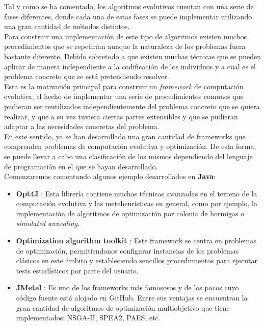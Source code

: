 Tal y como se ha comentado, los algoritmos evolutivos cuentan con una serie de fases diferentes, donde cada una de estas fases se puede implementar utilizando una gran cantidad de métodos distintos.\\

Para construir una implementación de este tipo de algoritmos existen muchos procedimientos que se repetirían aunque la naturaleza de los problemas fuera bastante diferente. Debido sobretodo a que existen muchas técnicas que se pueden aplicar de manera independiente a la codificación de los individuos y a cual es el problema concreto que se está pretendiendo resolver. \\

Esta es la motivación principal para construir un \textit{framework} de computación evolutiva, el hecho de implementar una serie de procedimientos comunes que pudieran ser reutilizados independientemente del problema concreto que se quiera realizar, y que a su vez tuviera ciertas partes extensibles y que se pudieran adaptar a las necesidades concretas del problema. \\

En este sentido, ya se han desarrollado una gran cantidad de frameworks que comprenden problemas de computación evolutiva y optimización. De esta forma, se puede llevar a cabo una clasificación de los mismos dependiendo del lenguaje de programación en el que se hayan desarrollado. \\

Comenzaremos comentando algunos ejemplo desarrollados en \textbf{Java}:

\begin{itemize}
    \item \textbf{Opt4J} \cite{lukasiewycz2009opt4j}: Esta librería contiene muchas técnicas avanzadas en el terreno de la computación evolutiva y las meteheurísticas en general, como por ejemplo, la implementación de algoritmos de optimización por colonia de hormigas o \textit{simulated annealing}.
    \item \textbf{Optimization algorithm toolkit} \cite{brownlee2007oat}: Este framework se centra en problemas de optimización, permitiendonos configurar instancias de los problemas clásicos en este ámbito y estableciendo sencillos procedimientos para ejecutar tests estadísticos por parte del usuario.
    \item \textbf{JMetal} \cite{durillo2011jmetal}: Es uno de los frameworks más famososos y de los pocos cuyo código fuente está alojado en GitHub. Entre sus ventajas se encuentran la gran cantidad de algoritmos de optimización multiobjetivo que tiene implementados:  NSGA-II, SPEA2, PAES, etc.
\end{itemize}


